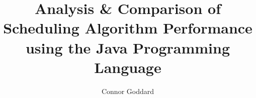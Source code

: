 \documentclass{acm_proc_article-sp}
\begin{document}
\title{Analysis \& Comparison of Scheduling Algorithm Performance using the Java Programming Language}
%
%
%
%
%

%
\author{
%
%
\alignauthor
Connor Goddard\\%
       \\
       \\
       \vspace{2mm}
}

\end{document}
